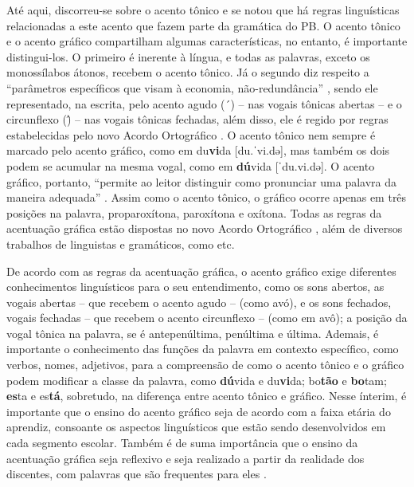 \documentclass{textolivre}
\begin{document}
Até aqui, discorreu-se sobre o acento tônico e se notou que há regras linguísticas relacionadas a este acento que fazem parte da gramática do PB. O acento tônico e o acento gráfico compartilham algumas características, no entanto, é importante distingui-los. O primeiro é inerente à língua, e todas as palavras, exceto os monossílabos átonos, recebem o acento tônico. Já o segundo diz respeito a “parâmetros específicos que visam à economia, não-redundância” \cite[p. 140]{couto+guimaraes2020}, sendo ele representado, na escrita, pelo acento agudo (´) – nas vogais tônicas abertas – e o circunflexo (\^) – nas vogais tônicas fechadas, além disso, ele é regido por regras estabelecidas pelo novo Acordo Ortográfico \cite{brasil2008}. O acento tônico nem sempre é marcado pelo acento gráfico, como em du\textbf{vi}da [du.ˈvi.də], mas também os dois podem se acumular na mesma vogal, como em \textbf{dú}vida [ˈdu.vi.də]. O acento gráfico, portanto, “permite ao leitor distinguir como pronunciar uma palavra da maneira adequada” \cite[p. 437]{cristofaro2020}. Assim como o acento tônico, o gráfico ocorre apenas em três posições na palavra, proparoxítona, paroxítona e oxítona. Todas as regras da acentuação gráfica estão dispostas no novo Acordo Ortográfico \cite{brasil2008}, além de diversos trabalhos de linguistas e gramáticos, como \textcite{rochalima2011, marra2012, luft2013} etc.

De acordo com as regras da acentuação gráfica, o acento gráfico exige diferentes conhecimentos linguísticos para o seu entendimento, como os sons abertos, as vogais abertas – que recebem o acento agudo – (como avó), e os sons fechados, vogais fechadas – que recebem o acento circunflexo – (como em avô); a posição da vogal tônica na palavra, se é antepenúltima, penúltima e última. Ademais, é importante o conhecimento das funções da palavra em contexto específico, como verbos, nomes, adjetivos, para a compreensão de como o acento tônico e o gráfico podem modificar a classe da palavra, como \textbf{dú}vida e du\textbf{vi}da; bo\textbf{tão} e \textbf{bo}tam; \textbf{es}ta e es\textbf{tá}, sobretudo, na diferença entre acento tônico e gráfico. Nesse ínterim, é importante que o ensino do acento gráfico seja de acordo com a faixa etária do aprendiz, consoante os aspectos linguísticos que estão sendo desenvolvidos em cada segmento escolar. Também é de suma importância que o ensino da acentuação gráfica seja reflexivo e seja realizado a partir da realidade dos discentes, com palavras que são frequentes para eles \cite{couto+guimaraes2020}.
\end{document}
